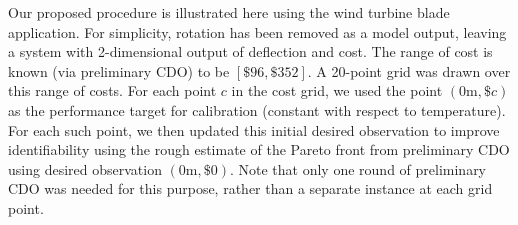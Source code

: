 \documentclass[12pt]{article}
\begin{document}
Our proposed procedure is illustrated here using the wind turbine blade application.
%
For simplicity, rotation has been removed as a model output, leaving a system with 2-dimensional output of deflection and cost. 
%
The range of cost is known (via preliminary CDO) to be $[\$96,\$352]$.
%
A 20-point grid was drawn over this range of costs. 
%
%
For each point $c$ in the cost grid, we used the point $(0\mathrm m,\$c)$ as the performance target for calibration (constant with respect to temperature).
%
For each such point, we then updated this initial desired observation to improve identifiability using the rough estimate of the Pareto front from preliminary CDO using desired observation $(0\mathrm m,\$0)$.
%
Note that only one round of preliminary CDO was needed for this purpose, rather than a separate instance at each grid point.
%
%
%
\end{document}

